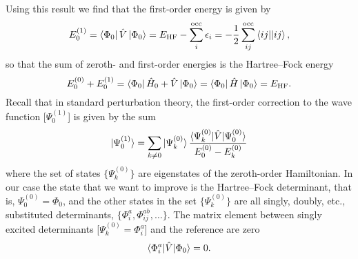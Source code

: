 \documentclass[../Main/chem532-notes.tex]{subfiles}
\begin{document}


Using this result we find that the first-order energy is given by
\begin{equation}
E^{(1)}_0 = \bra{\Phi_0} \hat{V} \ket{\Phi_0} = E_\mathrm{HF} - \sum_i^{\mathrm{occ}} \epsilon_i = -\frac{1}{2} \sum_{ij}^{\rm occ} \bra{ij}\!\ket{ij},
\end{equation}
so that the sum of zeroth- and first-order energies is the Hartree--Fock energy
\begin{equation}
E^{(0)}_0 + E^{(1)}_0 = \bra{\Phi_0} \hat{H}_0 + \hat{V} \ket{\Phi_0} = \bra{\Phi_0}  \hat{H} \ket{\Phi_0} =  E_\mathrm{HF}.
\end{equation}
Recall that in standard perturbation theory, the first-order correction to the wave function [$\Psi_0^{(1)}$] is given by the sum
\begin{equation}
\ket{\Psi_0^{(1)}} = \sum_{k \neq 0} \ket{\Psi_k^{(0)}} \frac{\braket{\Psi_k^{(0)}|\hat{V}|\Psi_0^{(0)}}}{E_0^{(0)} - E_k^{(0)}}
\end{equation}
where the set of states $\{\Psi_k^{(0)}\}$ are eigenstates of the zeroth-order Hamiltonian.
In our case the state that we want to improve is the Hartree--Fock determinant, that is, $\Psi_0^{(0)} = \Phi_0$, and the other states in the set $\{\Psi_k^{(0)}\}$ are all singly, doubly, etc., substituted determinants, $\{\Phi_{i}^{a}, \Phi_{ij}^{ab}, \ldots \}$.
The matrix element between singly excited determinants [$\Psi_k^{(0)} = \Phi_{i}^{a}$]  and the reference are zero
\begin{equation}
\braket{\Phi_{i}^{a}|\hat{V}|\Phi_0} = 0.
\end{equation}
\end{document}

